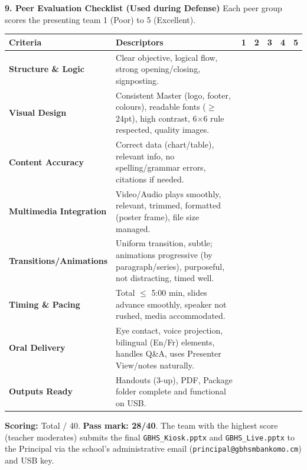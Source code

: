 \documentclass[11pt]{article}
\begin{document}
\textbf{9. Peer Evaluation Checklist (Used during Defense)}
Each peer group scores the presenting team 1 (Poor) to 5 (Excellent).

\begin{center}
\begin{tabularx}{\linewidth}{|l|X|ccccc|}\hline
\rowcolor{popblueL} \textbf{Criteria} & \textbf{Descriptors} & \textbf{1} & \textbf{2} & \textbf{3} & \textbf{4} & \textbf{5} \\ \hline
\textbf{Structure \& Logic} & Clear objective, logical flow, strong opening/closing, signposting. & & & & & \\ \hline
\textbf{Visual Design} & Consistent Master (logo, footer, colours), readable fonts ($\ge$24pt), high contrast, 6$\times$6 rule respected, quality images. & & & & & \\ \hline
\textbf{Content Accuracy} & Correct data (chart/table), relevant info, no spelling/grammar errors, citations if needed. & & & & & \\ \hline
\textbf{Multimedia Integration} & Video/Audio plays smoothly, relevant, trimmed, formatted (poster frame), file size managed. & & & & & \\ \hline
\textbf{Transitions/Animations} & Uniform transition, subtle; animations progressive (by paragraph/series), purposeful, not distracting, timed well. & & & & & \\ \hline
\textbf{Timing \& Pacing} & Total $\le$ 5:00 min, slides advance smoothly, speaker not rushed, media accommodated. & & & & & \\ \hline
\textbf{Oral Delivery} & Eye contact, voice projection, bilingual (En/Fr) elements, handles Q\&A, uses Presenter View/notes naturally. & & & & & \\ \hline
\textbf{Outputs Ready} & Handouts (3-up), PDF, Package folder complete and functional on USB. & & & & & \\ \hline
\end{tabularx}
\end{center}

\textbf{Scoring:} Total / 40. \textbf{Pass mark: 28/40}. The team with the highest score (teacher moderates) submits the final \texttt{GBHS\_Kiosk.pptx} and \texttt{GBHS\_Live.pptx} to the Principal via the school's administrative email (\texttt{principal@gbhsmbankomo.cm}) and USB key.
\end{document}
